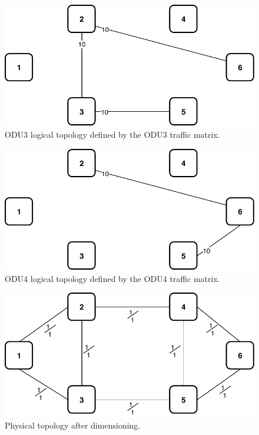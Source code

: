 \begin{figure}[h!]
\centering
\includegraphics[width=12cm]{sdf/ilp/opaque_protection/figures/logical_topology_ODU3_medium}
\caption{ODU3 logical topology defined by the ODU3 traffic matrix.}
\label{logical_ODU3_protectionmedium}
\end{figure}

\begin{figure}[h!]
\centering
\includegraphics[width=12cm]{sdf/ilp/opaque_protection/figures/logical_topology_ODU4_medium}
\caption{ODU4 logical topology defined by the ODU4 traffic matrix.}
\label{logical_ODU4_protectionmedium}
\end{figure}
\newpage
\begin{figure}[h!]
\centering
\includegraphics[width=12cm]{sdf/ilp/opaque_protection/figures/physical_topology}
\caption{Physical topology after dimensioning.}
\label{physical_protectionmedium}
\end{figure}

